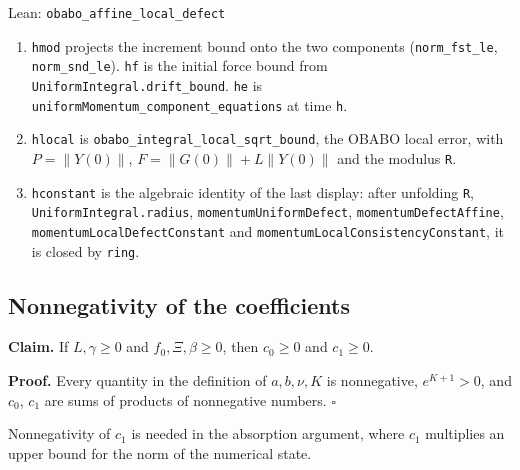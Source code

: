 \documentclass[11pt,a4paper]{report}
\begin{document}
\begin{leanbox}{Lean: \texttt{obabo\_\allowbreak{}affine\_\allowbreak{}local\_\allowbreak{}defect}}
\begin{enumerate}
\item \texttt{hmod} projects the increment bound onto the two components (\texttt{norm\_\allowbreak{}fst\_\allowbreak{}le}, \texttt{norm\_\allowbreak{}snd\_\allowbreak{}le}). \texttt{hf} is the initial force bound from \texttt{Uniform\allowbreak{}Integral.\allowbreak{}drift\_\allowbreak{}bound}. \texttt{he} is \texttt{uniform\allowbreak{}Momentum\_\allowbreak{}component\_\allowbreak{}equations} at time \texttt{h}.

\item \texttt{hlocal} is \texttt{obabo\_\allowbreak{}integral\_\allowbreak{}local\_\allowbreak{}sqrt\_\allowbreak{}bound}, the OBABO local error, with \(P=\|Y(0)\|\), \(F=\|G(0)\|+L\|Y(0)\|\) and the modulus \texttt{R}.

\item \texttt{hconstant} is the algebraic identity of the last display: after unfolding \texttt{R}, \texttt{Uniform\allowbreak{}Integral.\allowbreak{}radius}, \texttt{momentum\allowbreak{}Uniform\allowbreak{}Defect}, \texttt{momentum\allowbreak{}Defect\allowbreak{}Affine}, \texttt{momentum\allowbreak{}Local\allowbreak{}Defect\allowbreak{}Constant} and \texttt{momentum\allowbreak{}Local\allowbreak{}Consistency\allowbreak{}Constant}, it is closed by \texttt{ring}.

\end{enumerate}
\end{leanbox}
\subsection{\texorpdfstring{Nonnegativity of the coefficients}{Nonnegativity of the coefficients}}


\textbf{Claim.} If \(L,\gamma\ge0\) and \(f_0,\Xi,\beta\ge0\), then \(c_0\ge0\) and \(c_1\ge0\).




\textbf{Proof.} Every quantity in the definition of \(a,b,\nu,K\) is nonnegative, \(e^{K+1}>0\), and \(c_0\), \(c_1\) are sums of products of nonnegative numbers. \(\square\)




Nonnegativity of \(c_1\) is needed in the absorption argument, where \(c_1\) multiplies an upper bound for the norm of the numerical state.
\end{document}
